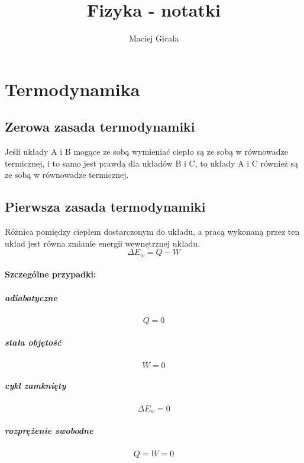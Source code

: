 \documentclass{article}
\title{Fizyka - notatki}
\author{Maciej Gicala}
\begin{document}
    \maketitle
    \section{Termodynamika}
        \subsection{Zerowa zasada termodynamiki}
        Jeśli układy A i B mogące ze sobą wymieniać ciepło są ze sobą w równowadze 
        termicznej, i to samo jest prawdą dla układów B i C, to układy A i C również 
        są ze sobą w równowadze termicznej.
        \subsection{Pierwsza zasada termodynamiki}
            Różnica pomiędzy ciepłem dostarczonym do układu, a pracą wykonaną przez ten 
            układ jest równa zmianie energii wewnętrznej układu.
            \begin{equation}
                \Delta E_w = Q - W
            \end{equation}
            \paragraph{Szczególne przypadki:}
                \subparagraph{adiabatyczne}
                \begin{equation}
                    Q = 0
                \end{equation}
                \subparagraph{stała objętość}
                \begin{equation}
                    W = 0
                \end{equation}
                \subparagraph{cykl zamknięty}
                \begin{equation}
                    \Delta E_w = 0
                \end{equation}
                \subparagraph{rozprężenie swobodne}
                \begin{equation}
                    Q = W = 0
                \end{equation}
        \newpage
\end{document}
